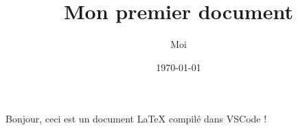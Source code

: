 \documentclass{article}
\title{Mon premier document}
\author{Moi}
\date{\today}
\begin{document}
\maketitle

Bonjour, ceci est un document \LaTeX{} compilé dans VSCode !
\end{document}
